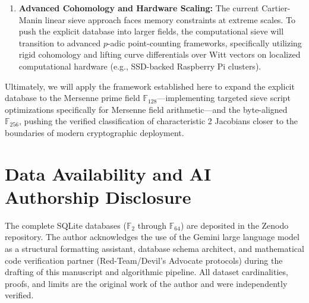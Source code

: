 \documentclass[11pt,letterpaper]{article}
\begin{document}
\begin{enumerate}
\item \textbf{Advanced Cohomology and Hardware Scaling:} The current Cartier-Manin linear sieve approach faces memory constraints at extreme scales. To push the explicit database into larger fields, the computational sieve will transition to advanced $p$-adic point-counting frameworks, specifically utilizing rigid cohomology and lifting curve differentials over Witt vectors on localized computational hardware (e.g., SSD-backed Raspberry Pi clusters).
\end{enumerate}

Ultimately, we will apply the framework established here to expand the explicit database to the Mersenne prime field $\mathbb{F}_{128}$---implementing targeted sieve script optimizations specifically for Mersenne field arithmetic---and the byte-aligned $\mathbb{F}_{256}$, pushing the verified classification of characteristic 2 Jacobians closer to the boundaries of modern cryptographic deployment.

\section{Data Availability and AI Authorship Disclosure}
The complete SQLite databases ($\mathbb{F}_{2}$ through $\mathbb{F}_{64}$) are deposited in the Zenodo repository. The author acknowledges the use of the Gemini large language model \cite{Gemini2026} as a structural formatting assistant, database schema architect, and mathematical code verification partner (Red-Team/Devil's Advocate protocols) during the drafting of this manuscript and algorithmic pipeline. All dataset cardinalities, proofs, and limits are the original work of the author and were independently verified.
\end{document}
